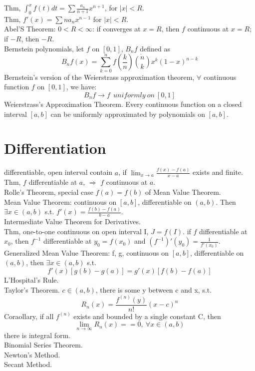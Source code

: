 \documentclass[paper=a4, fontsize=11pt]{scrartcl} %
\numberwithin{equation}{section} %
\numberwithin{figure}{section} %
\numberwithin{table}{section} %
\begin{document}
Thm, $\int_0^x f(t)dt = \sum \frac{a_n}{n+1} x^{n+1} $, for $|x|<R$.\\
Thm, $f'(x) = \sum na_nx^{n-1}$ for $|x|<R$.\\
Abel'S Theorem: $0<R<\infty$: if converges at $x=R$, then $f$ continuous at $x=R$; if $-R$, then $-R$.\\
Bernstein polynomials, let $f$ on $[0,1]$, $B_nf$ defined as
\begin{equation}
B_nf(x)  = \sum_{k=0} ^n f(\frac{k}{n})\dot {n \choose k} x^k(1-x)^{n-k}
\end{equation}
Bernstein’s version of the Weierstrass approximation theorem, $\forall$ continuous function $f$ on $[0,1]$, we have:
\begin{equation}
B_nf\rightarrow f\ \ uniformly\ on\ [0,1]
\end{equation}
Weierstrass’s Approximation Theorem. Every continuous function on a closed interval $[a,b]$ can be uniformly approximated by polynomials on $[a,b]$.\\

\section{Differentiation}
differentiable, open interval contain $a$, if $\lim_{x\rightarrow a} \frac{f(x)-f(a)}{x-a}$ exists and finite.\\
Thm, $f$ differentiable at $a$, $\Rightarrow$ $f$ continuous at $a$.\\
Rolle's Theorem, special case $f(a)=f(b)$ of Mean Value Theorem.\\
Mean Value Theorem: continuous on $[a,b]$, differentiable on $(a,b)$. Then $\exists x\in(a,b)$ s.t. $f'(x) = \frac{f(b)-f(a)}{b-a}$.\\
Intermediate Value Theorem for Derivatives.\\
Thm, one-to-one continuous on open interval I, $J=f(I)$. if $f$ differentiable at $x_0$, then $f^{-1}$ differentiable at $y_0=f(x_0)$ and $(f^{-1})'(y_0)  =  \frac{1}{f'(x_0)}$.\\
Generalized Mean Value Theorem: f, g, continuous on $[a,b]$, differentiable on $(a,b)$, then $\exists x\in(a,b)$ s.t.
\begin{equation}
f'(x)[g(b) - g(a)] =  g'(x) [f(b) - f(a)]
\end{equation}
L'Hospital's Rule.\\
Taylor's Theorem. $c\in (a,b)$, there is some y between c and x, s.t.
\begin{equation}
R_n(x) = \frac{f^{(n)}(y)}{n!} (x-c)^n
\end{equation}
Coraollary, if all $f^{(n)}$ exists and bounded by a single constant C, then
\begin{equation}
\lim_{n\rightarrow \infty}R_n(x) = =0,\ \forall x\in(a,b)
\end{equation}
there is integral form.\\
Binomial Series Theorem.\\
Newton's Method.\\
Secant Method.\\
\end{document}
